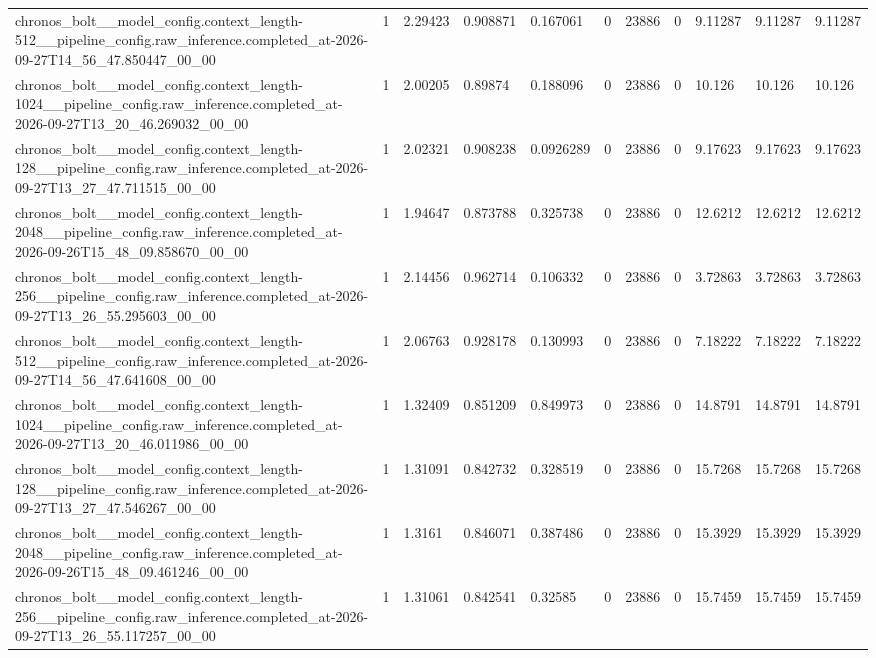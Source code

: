 \begin{tabular}{lllllllllll}
chronos\_bolt\_\_model\_config.context\_length-512\_\_pipeline\_config.raw\_inference.completed\_at-2026-09-27T14\_56\_47.850447\_00\_00 & 1 & 2.29423 & 0.908871 & 0.167061 & 0 & 23886 & 0 & 9.11287 & 9.11287 & 9.11287 \\
chronos\_bolt\_\_model\_config.context\_length-1024\_\_pipeline\_config.raw\_inference.completed\_at-2026-09-27T13\_20\_46.269032\_00\_00 & 1 & 2.00205 & 0.89874 & 0.188096 & 0 & 23886 & 0 & 10.126 & 10.126 & 10.126 \\
chronos\_bolt\_\_model\_config.context\_length-128\_\_pipeline\_config.raw\_inference.completed\_at-2026-09-27T13\_27\_47.711515\_00\_00 & 1 & 2.02321 & 0.908238 & 0.0926289 & 0 & 23886 & 0 & 9.17623 & 9.17623 & 9.17623 \\
chronos\_bolt\_\_model\_config.context\_length-2048\_\_pipeline\_config.raw\_inference.completed\_at-2026-09-26T15\_48\_09.858670\_00\_00 & 1 & 1.94647 & 0.873788 & 0.325738 & 0 & 23886 & 0 & 12.6212 & 12.6212 & 12.6212 \\
chronos\_bolt\_\_model\_config.context\_length-256\_\_pipeline\_config.raw\_inference.completed\_at-2026-09-27T13\_26\_55.295603\_00\_00 & 1 & 2.14456 & 0.962714 & 0.106332 & 0 & 23886 & 0 & 3.72863 & 3.72863 & 3.72863 \\
chronos\_bolt\_\_model\_config.context\_length-512\_\_pipeline\_config.raw\_inference.completed\_at-2026-09-27T14\_56\_47.641608\_00\_00 & 1 & 2.06763 & 0.928178 & 0.130993 & 0 & 23886 & 0 & 7.18222 & 7.18222 & 7.18222 \\
chronos\_bolt\_\_model\_config.context\_length-1024\_\_pipeline\_config.raw\_inference.completed\_at-2026-09-27T13\_20\_46.011986\_00\_00 & 1 & 1.32409 & 0.851209 & 0.849973 & 0 & 23886 & 0 & 14.8791 & 14.8791 & 14.8791 \\
chronos\_bolt\_\_model\_config.context\_length-128\_\_pipeline\_config.raw\_inference.completed\_at-2026-09-27T13\_27\_47.546267\_00\_00 & 1 & 1.31091 & 0.842732 & 0.328519 & 0 & 23886 & 0 & 15.7268 & 15.7268 & 15.7268 \\
chronos\_bolt\_\_model\_config.context\_length-2048\_\_pipeline\_config.raw\_inference.completed\_at-2026-09-26T15\_48\_09.461246\_00\_00 & 1 & 1.3161 & 0.846071 & 0.387486 & 0 & 23886 & 0 & 15.3929 & 15.3929 & 15.3929 \\
chronos\_bolt\_\_model\_config.context\_length-256\_\_pipeline\_config.raw\_inference.completed\_at-2026-09-27T13\_26\_55.117257\_00\_00 & 1 & 1.31061 & 0.842541 & 0.32585 & 0 & 23886 & 0 & 15.7459 & 15.7459 & 15.7459 \\

\end{tabular}
